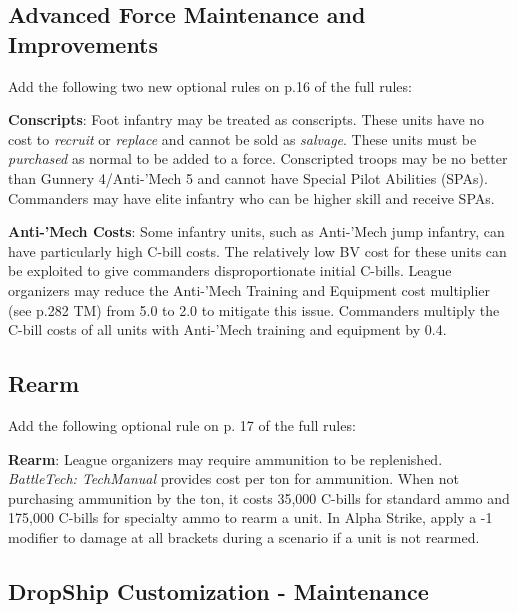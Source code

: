 \subsection{Advanced Force Maintenance and Improvements}

Add the following two new optional rules on p.16 of the full rules:

\begin{description}

\item {\bfseries Conscripts}: Foot infantry may be treated as conscripts.
These units have no cost to \emph{recruit} or \emph{replace} and cannot be sold as \emph{salvage}.
These units must be \emph{purchased} as normal to be added to a force.
Conscripted troops may be no better than Gunnery 4/Anti-'Mech 5 and cannot have Special Pilot Abilities (SPAs).
Commanders may have elite infantry who can be higher skill and receive SPAs.

\item {\bfseries Anti-'Mech Costs}: Some infantry units, such as Anti-'Mech jump infantry, can have particularly high C-bill costs.
The relatively low BV cost for these units can be exploited to give commanders disproportionate initial C-bills.
League organizers may reduce the Anti-'Mech Training and Equipment cost multiplier (see p.282 TM) from 5.0 to 2.0 to mitigate this issue.
Commanders multiply the C-bill costs of all units with Anti-'Mech training and equipment by 0.4.

\end{description}

\subsection{Rearm}

Add the following optional rule on p. 17 of the full rules:

{\bfseries Rearm}: League organizers may require ammunition to be replenished.
\emph{BattleTech: TechManual} provides cost per ton for ammunition.
When not purchasing ammunition by the ton, it costs 35,000 C-bills for standard ammo and 175,000 C-bills for specialty ammo to rearm a unit.
In Alpha Strike, apply a -1 modifier to damage at all brackets during a scenario if a unit is not rearmed.

\subsection{DropShip Customization - Maintenance}

